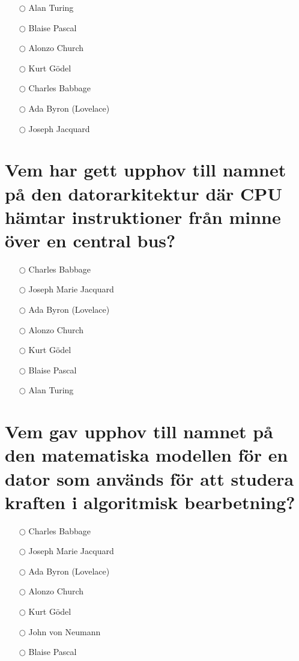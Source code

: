 \documentclass[a4paper,11pt,oneside]{book}
\begin{document}
\begin{sloppypar}
\label{q:439:mc:sv:True}

\begin{itemize}
  \item[$\bigcirc$] Alan Turing
  \item[$\bigcirc$] Blaise Pascal
  \item[$\bigcirc$] Alonzo Church
  \item[$\bigcirc$] Kurt G\"odel
  \item[$\bigcirc$] Charles Babbage
  \item[$\bigcirc$] Ada Byron (Lovelace)
  \item[$\bigcirc$] Joseph Jacquard
\end{itemize}



\section{Vem har gett upphov till namnet p\r{a} den datorarkitektur d\"ar CPU h\"amtar instruktioner fr\r{a}n minne \"over en central bus?}

\label{q:440:mc:sv:True}

\begin{itemize}
  \item[$\bigcirc$] Charles Babbage
  \item[$\bigcirc$] Joseph Marie Jacquard
  \item[$\bigcirc$] Ada Byron (Lovelace)
  \item[$\bigcirc$] Alonzo Church
  \item[$\bigcirc$] Kurt G\"odel
  \item[$\bigcirc$] Blaise Pascal
  \item[$\bigcirc$] Alan Turing
\end{itemize}



\section{Vem gav upphov till namnet p\r{a} den matematiska modellen f\"or en dator som anv\"ands f\"or att studera kraften i algoritmisk bearbetning?}

\label{q:441:mc:sv:True}

\begin{itemize}
  \item[$\bigcirc$] Charles Babbage
  \item[$\bigcirc$] Joseph Marie Jacquard
  \item[$\bigcirc$] Ada Byron (Lovelace)
  \item[$\bigcirc$] Alonzo Church
  \item[$\bigcirc$] Kurt G\"odel
  \item[$\bigcirc$] John von Neumann
  \item[$\bigcirc$] Blaise Pascal
\end{itemize}




\end{sloppypar}
\end{document}
